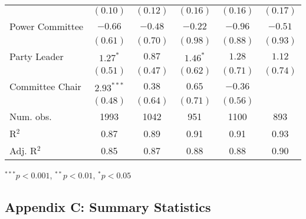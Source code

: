 \documentclass[12pt]{article}
\begin{document}
\begin{table}[H]
\begin{threeparttable}
\begin{tabular}{l c c c c c }
                              & $(0.10)$      & $(0.12)$     & $(0.16)$      & $(0.16)$      & $(0.17)$     \\
Power Committee               & $-0.66$       & $-0.48$      & $-0.22$       & $-0.96$       & $-0.51$      \\
                              & $(0.61)$      & $(0.70)$     & $(0.98)$      & $(0.88)$      & $(0.93)$     \\
Party Leader                  & $1.27^{*}$    & $0.87$       & $1.46^{*}$    & $1.28$        & $1.12$       \\
                              & $(0.51)$      & $(0.47)$     & $(0.62)$      & $(0.71)$      & $(0.74)$     \\
Committee Chair               & $2.93^{***}$  & $0.38$       & $0.65$        & $-0.36$       &              \\
                              & $(0.48)$      & $(0.64)$     & $(0.71)$      & $(0.56)$      &              \\
\hline
Num. obs.                     & 1993          & 1042         & 951           & 1100          & 893          \\
R$^2$                         & 0.87          & 0.89         & 0.91          & 0.91          & 0.93         \\
Adj. R$^2$                    & 0.85          & 0.87         & 0.88          & 0.88          & 0.90         \\
\hline
\end{tabular}
\begin{tablenotes}
   \item
   $^{***}p<0.001$, $^{**}p<0.01$, $^*p<0.05$
 \end{tablenotes}
\end{threeparttable}
\end{table}

\clearpage

\subsection*{Appendix C: Summary Statistics}
%
\end{document}
